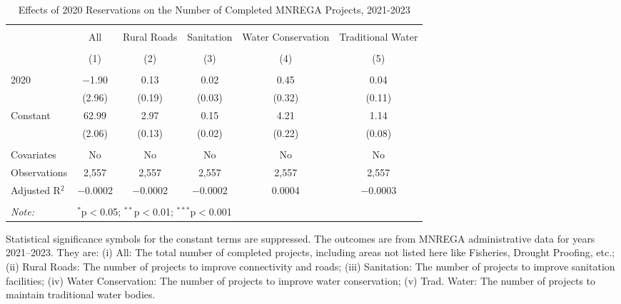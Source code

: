 \begin{table}[!htbp]
\centering
\begin{threeparttable}

  \caption{Effects of 2020 Reservations on the Number of Completed MNREGA Projects, 2021-2023} 
  \label{main_mnrega_20} 
\scriptsize 
\begin{tabular}{@{\extracolsep{0pt}}lccccc} 
\\[-1.8ex]\hline 
\hline \\[-1.8ex] 
 & All & Rural Roads & Sanitation & Water Conservation & Traditional Water \\ 
\\[-1.8ex] & (1) & (2) & (3) & (4) & (5)\\ 
\hline \\[-1.8ex] 
 2020 & $-$1.90 & 0.13 & 0.02 & 0.45 & 0.04 \\ 
  & (2.96) & (0.19) & (0.03) & (0.32) & (0.11) \\ 
  Constant & 62.99 & 2.97 & 0.15 & 4.21 & 1.14 \\ 
  & (2.06) & (0.13) & (0.02) & (0.22) & (0.08) \\ 
 \hline \\[-1.8ex] 
Covariates & No & No & No & No & No \\ 
Observations & 2,557 & 2,557 & 2,557 & 2,557 & 2,557 \\ 
Adjusted R$^{2}$ & $-$0.0002 & $-$0.0002 & $-$0.0002 & 0.0004 & $-$0.0003 \\ 
\hline 
\hline \\[-1.8ex] 
\textit{Note:}  & \multicolumn{5}{l}{$^{*}$p$<$0.05; $^{**}$p$<$0.01; $^{***}$p$<$0.001} \\ 
\end{tabular} 
\begin{tablenotes}[flushleft]
\scriptsize
\item[] Statistical significance symbols for the constant terms are suppressed. The outcomes are from MNREGA administrative data for years 2021--2023. They are: 
(i) All: The total number of completed projects, including areas not listed here like Fisheries, Drought Proofing, etc.;
(ii) Rural Roads: The number of projects to improve connectivity and roads;
(iii) Sanitation: The number of projects to improve sanitation facilities;
(iv) Water Conservation: The number of projects to improve water conservation;
(v) Trad. Water: The number of projects to maintain traditional water bodies.
\end{tablenotes}
\end{threeparttable}
\end{table}
